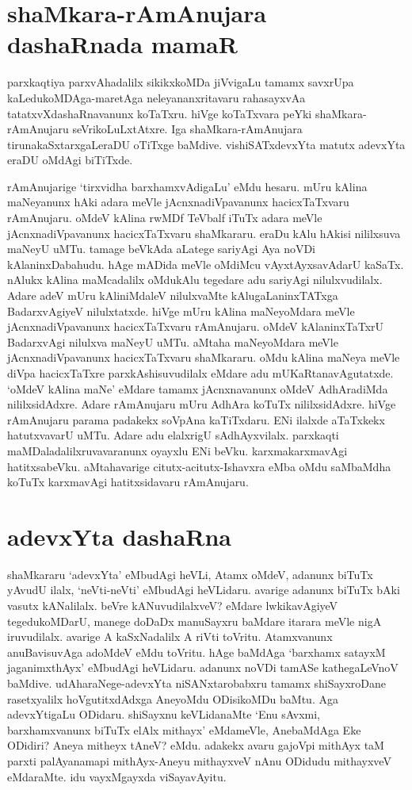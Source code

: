 \section*{shaMkara-rAmAnujara dashaRnada mamaR}

parxkaqtiya parxvAhadalilx sikikxkoMDa jiVvigaLu tamamx savxrUpa kaLedukoMDAga-maretAga neleyananxritavaru rahasayxvAa tatatxvXdashaRnavanunx koTaTxru. hiVge koTaTxvara peYki shaMkara-rAmAnujaru seVrikoLuLxtAtxre. Iga shaMkara-rAmAnujara tirunakaSxtarxgaLeraDU oTiTxge baMdive. vishiSATxdevxYta matutx adevxYta eraDU oMdAgi biTiTxde.

rAmAnujarige `tirxvidha barxhamxvAdigaLu' eMdu hesaru. mUru kAlina maNeyanunx hAki adara meVle jAcnxnadiVpavanunx hacicxTaTxvaru rAmAnujaru. oMdeV kAlina rwMDf TeVbalf iTuTx adara meVle jAcnxnadiVpavanunx hacicxTaTxvaru shaMkararu. eraDu kAlu hAkisi nililxsuva maNeyU uMTu. tamage beVkAda aLatege sariyAgi Aya noVDi kAlaninxDabahudu. hAge mADida meVle oMdiMcu vAyxtAyxsavAdarU kaSaTx. nAlukx kAlina maMcadalilx oMdukAlu tegedare adu sariyAgi nilulxvudilalx. Adare adeV mUru kAliniMdaleV nilulxvaMte kAlugaLaninxTATxga BadarxvAgiyeV nilulxtatxde. hiVge mUru kAlina maNeyoMdara meVle jAcnxnadiVpavanunx hacicxTaTxvaru rAmAnujaru. oMdeV kAlaninxTaTxrU BadarxvAgi nilulxva maNeyU uMTu. aMtaha maNeyoMdara meVle jAcnxnadiVpavanunx hacicxTaTxvaru shaMkararu. oMdu kAlina maNeya meVle diVpa hacicxTaTxre parxkAshisuvudilalx eMdare adu mUKaRtanavAgutatxde. `oMdeV kAlina maNe' eMdare tamamx jAcnxnavanunx oMdeV AdhAradiMda nililxsidAdxre. Adare rAmAnujaru mUru AdhAra koTuTx nililxsidAdxre. hiVge rAmAnujaru parama padakekx soVpAna kaTiTxdaru. ENi ilalxde aTaTxkekx hatutxvavarU uMTu. Adare adu elalxrigU sAdhAyxvilalx. parxkaqti maMDaladalilxruvavaranunx oyayxlu ENi beVku. karxmakarxmavAgi hatitxsabeVku. aMtahavarige citutx-acitutx-Ishavxra eMba oMdu saMbaMdha koTuTx karxmavAgi hatitxsidavaru rAmAnujaru.

\section*{adevxYta dashaRna}

shaMkararu `adevxYta' eMbudAgi heVLi, Atamx oMdeV, adanunx biTuTx yAvudU ilalx, `neVti-neVti' eMbudAgi heVLidaru. avarige adanunx biTuTx bAki vasutx kANalilalx. beVre kANuvudilalxveV? eMdare lwkikavAgiyeV tegedukoMDarU, manege doDaDx manuSayxru baMdare itarara meVle nigA iruvudilalx. avarige A kaSxNadalilx A riVti toVritu. Atamxvanunx anuBavisuvAga adoMdeV eMdu toVritu. hAge baMdAga `barxhamx satayxM jaganimxthAyx'\label{54a} eMbudAgi heVLidaru. adanunx noVDi tamASe kathegaLeVnoV baMdive. udAharaNege-adevxYta niSANxtarobabxru tamamx shiSayxroDane rasetxyalilx hoVgutitxdAdxga AneyoMdu ODisikoMDu baMtu. Aga adevxYtigaLu ODidaru. shiSayxnu keVLidanaMte `Enu sAvxmi, barxhamxvanunx biTuTx elAlx mithayx' eMdameVle, AnebaMdAga Eke ODidiri? Aneya mitheyx tAneV? eMdu. adakekx avaru gajoVpi mithAyx\label{54} taM parxti palAyanamapi mithAyx-Aneyu mithayxveV nAnu ODidudu mithayxveV eMdaraMte. idu vayxMgayxda viSayavAyitu.

